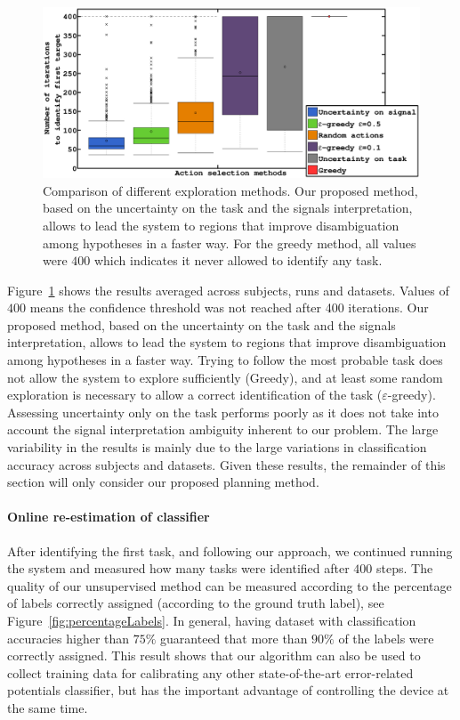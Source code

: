 \documentclass[letterpaper]{article}
\begin{document}
\begin{figure}[!ht]
    \centering
    \includegraphics[width=\columnwidth]{img/plot_planning_first}
    \caption{Comparison of different exploration methods. Our proposed method, based on the uncertainty on the task and the signals interpretation, allows to lead the system to regions that improve disambiguation among hypotheses in a faster way. For the greedy method, all values were $400$ which indicates it never allowed to identify any task.}
    \label{fig:compplan}
\end{figure}

Figure~\ref{fig:compplan} shows the results averaged across subjects, runs and datasets. Values of $400$ means the confidence threshold was not reached after 400 iterations. Our proposed method, based on the uncertainty on the task and the signals interpretation, allows to lead the system to regions that improve disambiguation among hypotheses in a faster way. Trying to follow the most probable task does not allow the system to explore sufficiently (Greedy), and at least some random exploration is necessary to allow a correct identification of the task ($\varepsilon$-greedy). Assessing uncertainty only on the task performs poorly as it does not take into account the signal interpretation ambiguity inherent to our problem. The large variability in the results is mainly due to the large variations in classification accuracy across subjects and datasets. Given these results, the remainder of this section will only consider our proposed planning method.

\paragraph{Online re-estimation of classifier}
After identifying the first task, and following our approach, we continued running the system and measured how many tasks were identified after $400$ steps. The quality of our unsupervised method can be measured according to the percentage of labels correctly assigned (according to the ground truth label), see Figure~\ref{fig:percentageLabels}. In general, having dataset with classification accuracies higher than $75\%$ guaranteed that more than $90\%$ of the labels were correctly assigned. This result shows that our algorithm can also be used to collect training data for calibrating any other state-of-the-art error-related potentials classifier, but has the important advantage of controlling the device at the same time.
\end{document}
